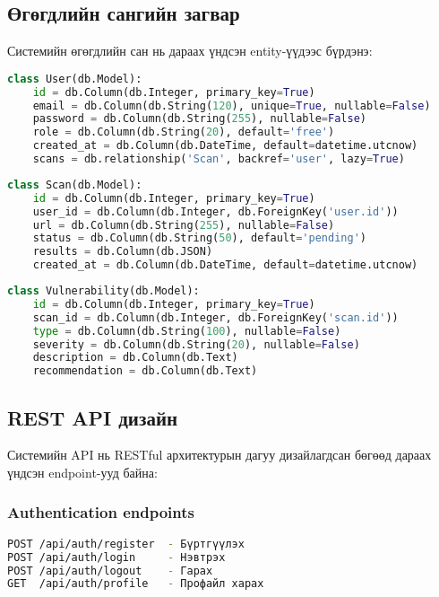 \documentclass[main.tex]{subfiles}
\begin{document}
\subsection{Өгөгдлийн сангийн загвар}

Системийн өгөгдлийн сан нь дараах үндсэн entity-үүдээс бүрдэнэ:

\begin{lstlisting}[language=Python, caption=User модель]
class User(db.Model):
    id = db.Column(db.Integer, primary_key=True)
    email = db.Column(db.String(120), unique=True, nullable=False)
    password = db.Column(db.String(255), nullable=False)
    role = db.Column(db.String(20), default='free')
    created_at = db.Column(db.DateTime, default=datetime.utcnow)
    scans = db.relationship('Scan', backref='user', lazy=True)
\end{lstlisting}

\begin{lstlisting}[language=Python, caption=Scan модель]
class Scan(db.Model):
    id = db.Column(db.Integer, primary_key=True)
    user_id = db.Column(db.Integer, db.ForeignKey('user.id'))
    url = db.Column(db.String(255), nullable=False)
    status = db.Column(db.String(50), default='pending')
    results = db.Column(db.JSON)
    created_at = db.Column(db.DateTime, default=datetime.utcnow)
\end{lstlisting}

\begin{lstlisting}[language=Python, caption=Vulnerability модель]
class Vulnerability(db.Model):
    id = db.Column(db.Integer, primary_key=True)
    scan_id = db.Column(db.Integer, db.ForeignKey('scan.id'))
    type = db.Column(db.String(100), nullable=False)
    severity = db.Column(db.String(20), nullable=False)
    description = db.Column(db.Text)
    recommendation = db.Column(db.Text)
\end{lstlisting}

\subsection{REST API дизайн}

Системийн API нь RESTful архитектурын дагуу дизайлагдсан бөгөөд дараах үндсэн endpoint-ууд байна:

\subsubsection{Authentication endpoints}
\begin{lstlisting}[language=bash, caption=Аутентификацийн API]
POST /api/auth/register  - Бүртгүүлэх
POST /api/auth/login     - Нэвтрэх
POST /api/auth/logout    - Гарах
GET  /api/auth/profile   - Профайл харах
\end{lstlisting}
\end{document}
